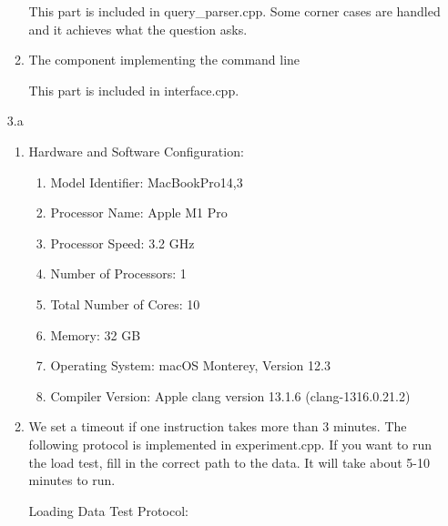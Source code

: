 \documentclass{article}
\begin{document}
\begin{enumerate}
\begin{enumerate}
This part is included in query\_parser.cpp. Some corner cases are handled and it achieves what the question asks. 

\item The component implementing the command line

This part is included in interface.cpp.

\end{enumerate}
\newpage
\item[3.a]
\begin{enumerate}
\item Hardware and Software Configuration:

\begin{enumerate}
\item Model Identifier:	MacBookPro14,3

\item Processor Name:	Apple M1 Pro

\item Processor Speed:	3.2 GHz

\item Number of Processors:	1

\item Total Number of Cores:	10

\item Memory:	32 GB

\item Operating System: macOS Monterey, Version 12.3

\item Compiler Version: Apple clang version 13.1.6 (clang-1316.0.21.2)

\end{enumerate}

\item 

We set a timeout if one instruction takes more than 3 minutes. The following protocol is implemented in experiment.cpp. If you want to run the load test, fill in the correct path to the data. It will take about 5-10 minutes to run. 

Loading Data Test Protocol:


\end{enumerate}
\end{enumerate}
\end{document}
